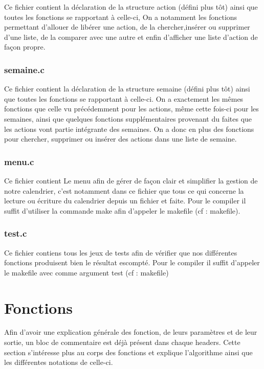 \documentclass[11pt]{article}
\begin{document}
Ce fichier contient la déclaration de la structure action (défini plus tôt)
ainsi que toutes les fonctions se rapportant à celle-ci, On a notamment les
fonctions permettant d'allouer de libérer une action, de la chercher,insérer
ou supprimer d'une liste, de la comparer avec une autre et enfin d'afficher
une liste d'action de façon propre.


\subsubsection{semaine.c}
\label{sec:orgc2c38a1}

Ce fichier contient la déclaration de la structure semaine (défini plus tôt)
ainsi que toutes les fonctions se rapportant à celle-ci. On a exactement les
mêmes fonctions que celle vu précédemment pour les actions, même cette fois-ci
pour les semaines, ainsi que quelques fonctions supplémentaires provenant du
faites que les actions vont partie intégrante des semaines. On a donc en plus
des fonctions pour chercher, supprimer ou insérer des actions dans une liste
de semaine.


\subsubsection{menu.c}
\label{sec:orga4d5061}

Ce fichier contient Le menu afin de gérer de façon clair et simplifier la
gestion de notre calendrier, c'est notamment dans ce fichier que tous ce qui
concerne la lecture ou écriture du calendrier depuis un fichier et faite.
Pour le compiler il suffit d'utiliser la commande make afin d'appeler le
makefile (cf : makefile).


\subsubsection{test.c}
\label{sec:orgd7654ee}

Ce fichier contiens tous les jeux de tests afin de vérifier que nos
différentes fonctions produisent bien le résultat escompté. Pour le compiler
il suffit d'appeler le makefile avec comme argument test (cf : makefile) 


\section{Fonctions}
\label{sec:org2bf2057}

Afin d'avoir une explication générale des fonction, de leurs paramètres et de
leur sortie, un bloc de commentaire est déjà présent dans chaque headers. Cette
section s'intéresse plus au corps des fonctions et explique l'algorithme ainsi
que les différentes notations de celle-ci.
\end{document}
